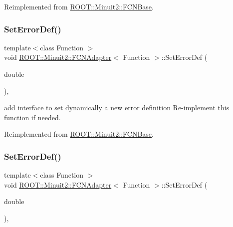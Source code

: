 Reimplemented from \mbox{\hyperlink{classROOT_1_1Minuit2_1_1FCNBase_a840e02c2e6ef96eec289deca096b6088}{R\+O\+O\+T\+::\+Minuit2\+::\+F\+C\+N\+Base}}.

\mbox{\label{classROOT_1_1Minuit2_1_1FCNAdapter_ad87419db3f1d4764497f52487fef6fc8}} 
\subsubsection{\texorpdfstring{SetErrorDef()}{SetErrorDef()}\hspace{0.1cm}{\footnotesize\ttfamily [2/3]}}
{\footnotesize\ttfamily template$<$class Function $>$ \\
void \mbox{\hyperlink{classROOT_1_1Minuit2_1_1FCNAdapter}{R\+O\+O\+T\+::\+Minuit2\+::\+F\+C\+N\+Adapter}}$<$ Function $>$\+::Set\+Error\+Def (\begin{DoxyParamCaption}\item[{double}]{ }\end{DoxyParamCaption})\hspace{0.3cm}{\ttfamily [inline]}, {\ttfamily [virtual]}}

add interface to set dynamically a new error definition Re-\/implement this function if needed. 

Reimplemented from \mbox{\hyperlink{classROOT_1_1Minuit2_1_1FCNBase_a840e02c2e6ef96eec289deca096b6088}{R\+O\+O\+T\+::\+Minuit2\+::\+F\+C\+N\+Base}}.

\mbox{\label{classROOT_1_1Minuit2_1_1FCNAdapter_ad87419db3f1d4764497f52487fef6fc8}} 
\subsubsection{\texorpdfstring{SetErrorDef()}{SetErrorDef()}\hspace{0.1cm}{\footnotesize\ttfamily [3/3]}}
{\footnotesize\ttfamily template$<$class Function $>$ \\
void \mbox{\hyperlink{classROOT_1_1Minuit2_1_1FCNAdapter}{R\+O\+O\+T\+::\+Minuit2\+::\+F\+C\+N\+Adapter}}$<$ Function $>$\+::Set\+Error\+Def (\begin{DoxyParamCaption}\item[{double}]{ }\end{DoxyParamCaption})\hspace{0.3cm}{\ttfamily [inline]}, {\ttfamily [virtual]}}

